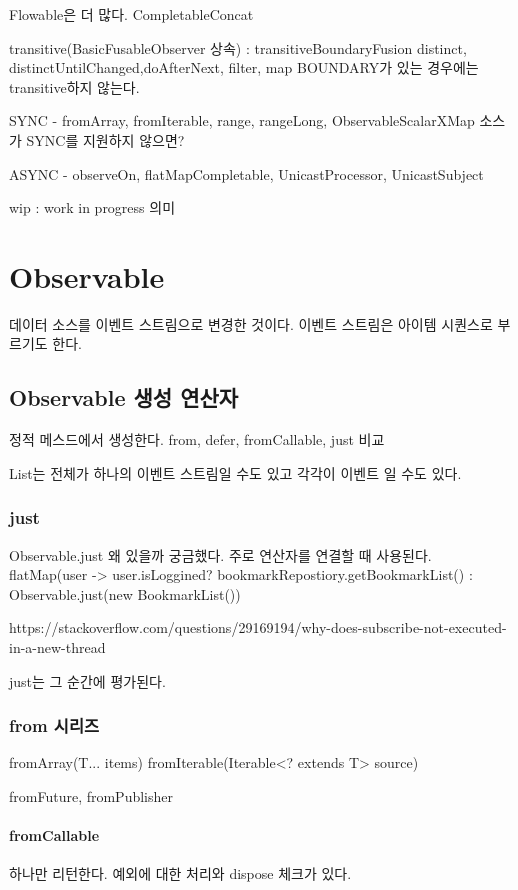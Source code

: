 \documentclass{book}
\begin{document}
Flowable은 더 많다.
CompletableConcat

transitive(BasicFusableObserver 상속) : transitiveBoundaryFusion
distinct, distinctUntilChanged,doAfterNext, filter, map
BOUNDARY가 있는 경우에는 transitive하지 않는다.



SYNC - fromArray, fromIterable, range, rangeLong, ObservableScalarXMap
소스가 SYNC를 지원하지 않으면?

ASYNC - observeOn, flatMapCompletable, UnicastProcessor, UnicastSubject

wip : work in progress 의미


\chapter{Observable}
데이터 소스를 이벤트 스트림으로 변경한 것이다.
이벤트 스트림은 아이템 시퀀스로 부르기도 한다.

\section{Observable 생성 연산자}
정적 메스드에서 생성한다.
from, defer, fromCallable, just 비교

List는 전체가 하나의 이벤트 스트림일 수도 있고 각각이 이벤트 일 수도 있다.

\subsection{just}
Observable.just
왜 있을까 궁금했다. 주로 연산자를 연결할 때 사용된다.
flatMap(user -> user.isLoggined? bookmarkRepostiory.getBookmarkList() : Observable.just(new BookmarkList())

https://stackoverflow.com/questions/29169194/why-does-subscribe-not-executed-in-a-new-thread

just는 그 순간에 평가된다.

\subsection{from 시리즈}
fromArray(T... items)
fromIterable(Iterable<? extends T> source)

fromFuture, fromPublisher

\subsubsection{fromCallable}
하나만 리턴한다. 예외에 대한 처리와 dispose 체크가 있다.
\end{document}
